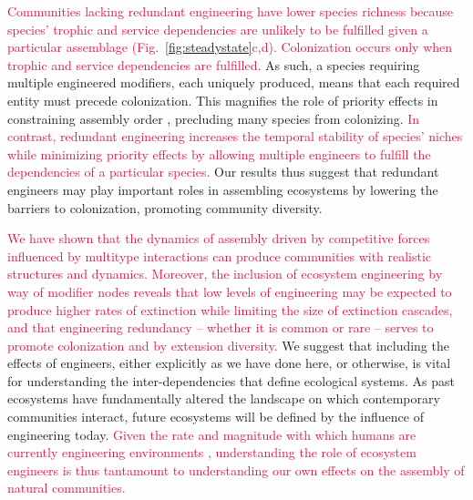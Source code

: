 \documentclass[twocolumn,preprintnumbers,amsmath,amssymb,superscriptaddress,linenumbers]{revtex4-1}
\newcommand{\rev}[1]{\textcolor{crimson}{#1}}
\begin{document}
\rev{Communities lacking redundant engineering have lower species richness because species' trophic and service dependencies are unlikely to be fulfilled given a particular assemblage (Fig.\ \ref{fig:steadystate}c,d).
Colonization occurs only when trophic and service dependencies are fulfilled.}
As such, a species requiring multiple engineered modifiers, each uniquely produced, means that each required entity must precede colonization.
This magnifies the role of priority effects in constraining assembly order \cite{Fukami2015}, precluding many species from colonizing.
\rev{In contrast, redundant engineering increases the temporal stability of species' niches while minimizing priority effects by allowing multiple engineers to fulfill the dependencies of a particular species.}
Our results thus suggest that redundant engineers may play important roles in assembling ecosystems by lowering the barriers to colonization, promoting community diversity.

\rev{We have shown that the dynamics of assembly driven by competitive forces influenced by multitype interactions can produce communities with realistic structures and dynamics. 
Moreover, the inclusion of ecosystem engineering by way of modifier nodes reveals that low levels of engineering may be expected to produce higher rates of extinction while limiting the size of extinction cascades, and that engineering redundancy -- whether it is common or rare -- serves to promote colonization and by extension diversity.}
We suggest that including the effects of engineers, either explicitly as we have done here, or otherwise, is vital for understanding the inter-dependencies that define ecological systems.
As past ecosystems have fundamentally altered the landscape on which contemporary communities interact, future ecosystems will be defined by the influence of engineering today.
\rev{Given the rate and magnitude with which humans are currently engineering environments \cite{Corlett2015}, understanding the role of ecosystem engineers is thus tantamount to understanding our own effects on the assembly of natural communities.}\\
\end{document}
